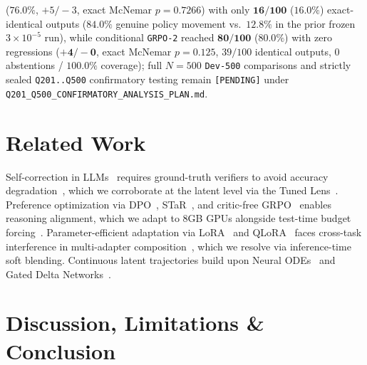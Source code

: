 \documentclass[11pt,a4paper]{article}
\begin{document}
($\mathbf{76.0\%}$, $+5/-3$, exact McNemar $p=0.7266$) with only $\mathbf{16/100}$ ($\mathbf{16.0\%}$) exact-identical outputs ($\mathbf{84.0\%}$ genuine policy movement vs.\ $12.8\%$ in the prior frozen $3\times 10^{-5}$ run), while conditional \texttt{GRPO-2} reached $\mathbf{80/100}$ ($\mathbf{80.0\%}$) with zero regressions ($\mathbf{+4/-0}$, exact McNemar $p=0.125$, $39/100$ identical outputs, $0$ abstentions / $100.0\%$ coverage); full $N=500$ \texttt{Dev-500} comparisons and strictly sealed \texttt{Q201..Q500} confirmatory testing remain \texttt{[PENDING]} under \texttt{Q201\_Q500\_CONFIRMATORY\_ANALYSIS\_PLAN.md}.

\section{Related Work}

Self-correction in LLMs~\cite{madaan2023selfrefine,shinn2023reflexion} requires ground-truth verifiers to avoid accuracy degradation~\cite{huang2023cannot}, which we corroborate at the latent level via the Tuned Lens~\cite{belrose2023tunedlens}. Preference optimization via DPO~\cite{rafailov2023dpo}, STaR~\cite{zelikman2022star}, and critic-free GRPO~\cite{shao2024deepseekmath} enables reasoning alignment, which we adapt to 8GB GPUs alongside test-time budget forcing~\cite{muennighoff2025s1}. Parameter-efficient adaptation via LoRA~\cite{hu2021lora} and QLoRA~\cite{dettmers2023qlora} faces cross-task interference in multi-adapter composition~\cite{huang2023lorahub}, which we resolve via inference-time soft blending. Continuous latent trajectories build upon Neural ODEs~\cite{chen2018neuralode} and Gated Delta Networks~\cite{yang2024gateddelta}.

\section{Discussion, Limitations \& Conclusion}
\end{document}
